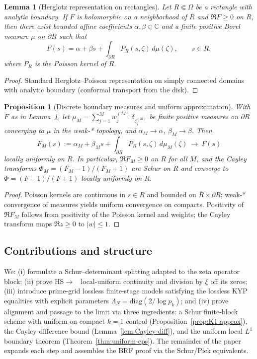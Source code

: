 \documentclass[11pt]{article}
\newtheorem{proposition}[theorem]{Proposition}
\newtheorem{lemma}[theorem]{Lemma}
\theoremstyle{remark}
\newcommand{\C}{\mathbb{C}}
\DeclareMathOperator{\dettwo}{det_2}
\begin{document}
\begin{lemma}[Herglotz representation on rectangles]\label{lem:herglotz-rect}
Let \(R\Subset\Omega\) be a rectangle with analytic boundary. If \(F\) is holomorphic on a neighborhood of \(\overline R\) and \(\Re F\ge 0\) on \(R\), then there exist bounded affine coefficients \(\alpha,\beta\in\C\) and a finite positive Borel measure \(\mu\) on \(\partial R\) such that
\[F(s)=\alpha+\beta s+\int_{\partial R} P_R(s,\zeta)\,d\mu(\zeta),\qquad s\in R,\]
where \(P_R\) is the Poisson kernel of \(R\).
\end{lemma}
\begin{proof}
Standard Herglotz--Poisson representation on simply connected domains with analytic boundary (conformal transport from the disk).
\end{proof}

\begin{proposition}[Discrete boundary measures and uniform approximation]\label{prop:discrete-Poisson}
With \(F\) as in Lemma~\ref{lem:herglotz-rect}, let \(\mu_M=\sum_{j=1}^{M} w_j^{(M)}\,\delta_{\zeta_j^{(M)}}\) be finite positive measures on \(\partial R\) converging to \(\mu\) in the weak-* topology, and \(\alpha_M\to\alpha\), \(\beta_M\to\beta\). Then
\[F_M(s):=\alpha_M+\beta_M s+\int_{\partial R} P_R(s,\zeta)\,d\mu_M(\zeta)\ \to\ F(s)\]
locally uniformly on \(R\). In particular, \(\Re F_M\ge 0\) on \(R\) for all \(M\), and the Cayley transforms \(\Phi_M=(F_M-1)/(F_M+1)\) are Schur on \(R\) and converge to \(\Phi=(F-1)/(F+1)\) locally uniformly on \(R\).
\end{proposition}
\begin{proof}
Poisson kernels are continuous in \(s\in R\) and bounded on \(\overline R\times\partial R\); weak-* convergence of measures yields uniform convergence on compacts. Positivity of \(\Re F_M\) follows from positivity of the Poisson kernel and weights; the Cayley transform maps \(\Re z\ge 0\) to \(|w|\le 1\).
\end{proof}
\subsection*{Contributions and structure}
We: (i) formulate a Schur--determinant splitting adapted to the zeta operator block; (ii) prove HS\(\to\)\(\dettwo\) local-uniform continuity and division by \(\xi\) off its zeros; (iii) introduce prime-grid lossless finite-stage models satisfying the lossless KYP equalities with explicit parameters \(\Lambda_N=\mathrm{diag}(2/\log p_k)\); and (iv) prove alignment and passage to the limit via three ingredients: a Schur finite-block scheme with uniform-on-compact $k=1$ control (Proposition~\ref{prop:K1-approx}), the Cayley-difference bound (Lemma~\ref{lem:Cayley-diff}), and the uniform local \(L^1\) boundary theorem (Theorem~\ref{thm:uniform-eps}). The remainder of the paper expands each step and assembles the BRF proof via the Schur/Pick equivalents.
\end{document}
